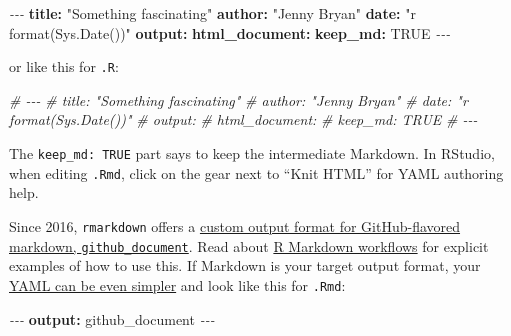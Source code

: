 \documentclass[
]{book}
\newenvironment{Shaded}{\begin{snugshade}}{\end{snugshade}}
\newcommand{\AttributeTok}[1]{\textcolor[rgb]{0.13,0.29,0.53}{#1}}
\newcommand{\CharTok}[1]{\textcolor[rgb]{0.31,0.60,0.02}{#1}}
\newcommand{\CommentTok}[1]{\textcolor[rgb]{0.56,0.35,0.01}{\textit{#1}}}
\newcommand{\FunctionTok}[1]{\textcolor[rgb]{0.13,0.29,0.53}{\textbf{#1}}}
\newcommand{\KeywordTok}[1]{\textcolor[rgb]{0.13,0.29,0.53}{\textbf{#1}}}
\newcommand{\PreprocessorTok}[1]{\textcolor[rgb]{0.56,0.35,0.01}{\textit{#1}}}
\newcommand{\StringTok}[1]{\textcolor[rgb]{0.31,0.60,0.02}{#1}}
\begin{document}
\begin{Shaded}
\begin{Highlighting}[]
\PreprocessorTok{{-}{-}{-}}
\FunctionTok{title}\KeywordTok{:}\AttributeTok{ }\StringTok{"Something fascinating"}
\FunctionTok{author}\KeywordTok{:}\AttributeTok{ }\StringTok{"Jenny Bryan"}
\FunctionTok{date}\KeywordTok{:}\AttributeTok{ }\StringTok{"\textasciigrave{}r format(Sys.Date())\textasciigrave{}"}
\FunctionTok{output}\KeywordTok{:}
\AttributeTok{  }\FunctionTok{html\_document}\KeywordTok{:}
\AttributeTok{    }\FunctionTok{keep\_md}\KeywordTok{:}\AttributeTok{ }\CharTok{TRUE}
\PreprocessorTok{{-}{-}{-}}
\end{Highlighting}
\end{Shaded}

or like this for \texttt{.R}:

\begin{Shaded}
\begin{Highlighting}[]
\CommentTok{\#\textquotesingle{} {-}{-}{-}}
\CommentTok{\#\textquotesingle{} title: "Something fascinating"}
\CommentTok{\#\textquotesingle{} author: "Jenny Bryan"}
\CommentTok{\#\textquotesingle{} date: "\textasciigrave{}r format(Sys.Date())\textasciigrave{}"}
\CommentTok{\#\textquotesingle{} output:}
\CommentTok{\#\textquotesingle{}   html\_document:}
\CommentTok{\#\textquotesingle{}     keep\_md: TRUE}
\CommentTok{\#\textquotesingle{} {-}{-}{-}}
\end{Highlighting}
\end{Shaded}

The \texttt{keep\_md:\ TRUE} part says to keep the intermediate Markdown. In RStudio, when editing \texttt{.Rmd}, click on the gear next to ``Knit HTML'' for YAML authoring help.

Since 2016, \texttt{rmarkdown} offers a \href{http://rmarkdown.rstudio.com/github_document_format.html}{custom output format for GitHub-flavored markdown, \texttt{github\_document}}. Read about \hyperref[rmd-test-drive]{R Markdown workflows} for explicit examples of how to use this. If Markdown is your target output format, your \href{https://gist.github.com/jennybc/402761e30b9be8023af9}{YAML can be even simpler} and look like this for \texttt{.Rmd}:

\begin{Shaded}
\begin{Highlighting}[]
\PreprocessorTok{{-}{-}{-}}
\FunctionTok{output}\KeywordTok{:}\AttributeTok{ github\_document}
\PreprocessorTok{{-}{-}{-}}
\end{Highlighting}
\end{Shaded}
\end{document}
